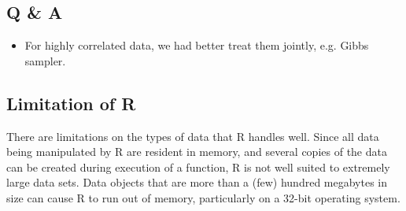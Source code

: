 \documentclass[11pt]{article}
\begin{document}
\subsection{Q \& A}
\begin{itemize}
  \item For highly correlated data, we had better treat them jointly, e.g. Gibbs sampler.
\end{itemize}
\subsection{Limitation of R}
There are limitations on the types of data that R handles well. Since all data being manipulated by R are resident in memory, and several copies of the data can be created during execution of a function, R is not well suited to extremely large data sets. Data objects that are more than a (few) hundred megabytes in size can cause R to run out of memory, particularly on a 32-bit operating system.
\end{document}
